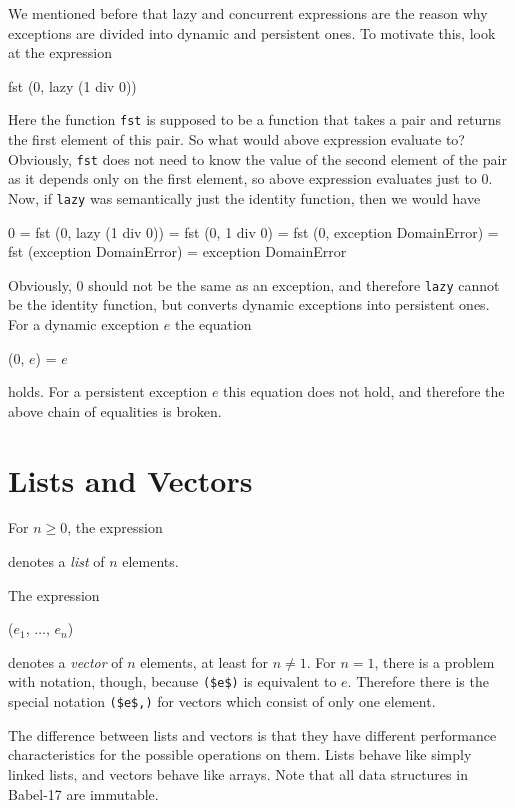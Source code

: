 \documentclass[11pt]{amsart}
\newcommand{\babelsrc}[1] {\lstinline!#1!}
\begin{document}
We mentioned before that lazy and concurrent expressions are the reason why exceptions are divided into dynamic and persistent ones. To motivate this, look at the expression
\begin{babellisting}
fst (0, lazy (1 div 0))
\end{babellisting}
Here the function \babelsrc{fst} is supposed to be a function that takes a pair and returns the first element of this pair. So what would above expression evaluate to? Obviously, \babelsrc{fst} does not need to know the value of the second element of the pair as it depends only on the first element, so above expression evaluates just to 0. Now, if \babelsrc{lazy} was semantically just the identity function, then we would have
\begin{babellisting}
0 = fst (0, lazy (1 div 0)) = fst (0, 1 div 0) = fst (0, exception DomainError) 
   = fst (exception DomainError) = exception DomainError
\end{babellisting}
Obviously, $0$ should not be the same as an exception, and therefore \babelsrc{lazy} cannot be the identity function, but converts dynamic exceptions into persistent ones. For a dynamic exception $e$ the equation
\begin{babellisting}
(0, $e$) = $e$
\end{babellisting}
holds. For a persistent exception $e$ this equation does not hold, and therefore the above chain of equalities is broken.

\section{Lists and Vectors}
For $n \ge 0$, the expression
\begin{babellisting}
[$e_1$, $\ldots$, $e_n$]
\end{babellisting}
denotes a \emph{list} of $n$ elements. 

The expression
\begin{babellisting}
($e_1$, $\ldots$, $e_n$)
\end{babellisting}
denotes a  \emph{vector} of $n$ elements, at least for $n \neq 1$. 
For $n=1$, there is a problem with notation, though, because \babelsrc{($e$)}  is equivalent to $e$. Therefore there is the special notation \babelsrc{($e$,)} for vectors which consist of only one element.

The difference between lists and vectors is that they have different performance characteristics for the possible operations on them. Lists behave like simply linked lists, and vectors behave like arrays. Note that all data structures in Babel-17 are immutable. 
\end{document}
